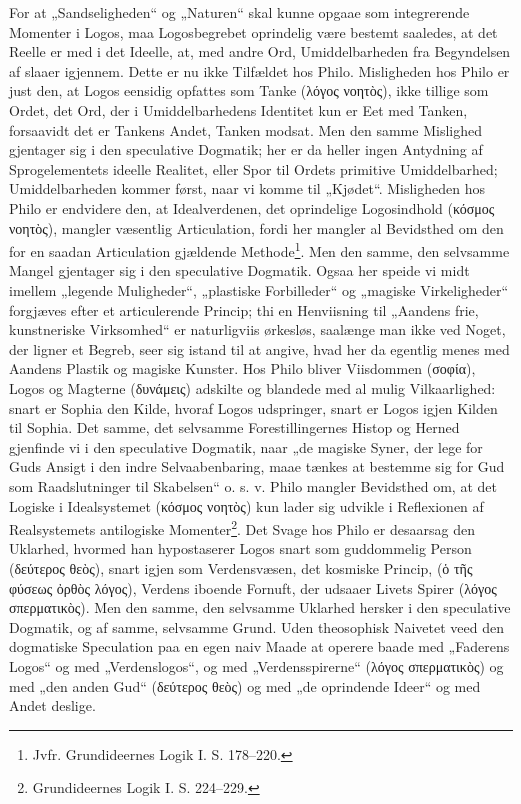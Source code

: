 \documentclass[12pt]{book}
\newcommand{\opage}[1]{\marginnote{\footnotesize\textit{[#1]}}}
\begin{document}
For at „Sandseligheden“ og „Naturen“ skal kunne opgaae
som integrerende Momenter i Logos, maa Logosbegrebet
oprindelig være bestemt saaledes, at det Reelle er med i det
Ideelle, at, med andre Ord, Umiddelbarheden fra Begyndelsen
af slaaer igjennem. Dette er nu ikke Tilfældet hos Philo.
Misligheden hos Philo er just den, at Logos eensidig opfattes
som Tanke (λόγος νοητὸς), ikke tillige som Ordet, det Ord,
der i Umiddelbarhedens Identitet kun er Eet med Tanken,
forsaavidt det er Tankens Andet, Tanken modsat. Men den
samme Mislighed gjentager sig i den speculative Dogmatik;
her er da heller ingen Antydning af Sprogelementets ideelle Realitet,
eller Spor til Ordets primitive Umiddelbarhed; Umiddelbarheden
kommer først, naar vi komme til „Kjødet“. Misligheden
hos Philo er endvidere den, at Idealverdenen, det oprindelige
Logosindhold (κόσμος νοητὸς), mangler væsentlig
Articulation, fordi her mangler al Bevidsthed om den for en
saadan Articulation gjældende Methode\footnote{Jvfr. Grundideernes Logik I. S. 178--220.}. %
Men den samme,
den selvsamme Mangel gjentager sig i den speculative Dogmatik.
Ogsaa her speide vi midt imellem „legende Muligheder“,
„plastiske Forbilleder“ og „magiske Virkeligheder“
\opage{92}forgjæves efter et articulerende Princip; thi en Henviisning
til „Aandens frie, kunstneriske Virksomhed“ er naturligviis
ørkesløs, saalænge man ikke ved Noget, der ligner et Begreb,
seer sig istand til at angive, hvad her da egentlig menes med
Aandens Plastik og magiske Kunster. Hos Philo bliver Viisdommen
(σοφία), Logos og Magterne (δυνάμεις) adskilte og
blandede med al mulig Vilkaarlighed: snart er Sophia den
Kilde, hvoraf Logos udspringer, snart er Logos igjen Kilden
til Sophia. Det samme, det selvsamme Forestillingernes Histop
og Herned gjenfinde vi i den speculative Dogmatik, naar „de
magiske Syner, der lege for Guds Ansigt i den indre Selvaabenbaring,
maae tænkes at bestemme sig for Gud som
Raadslutninger til Skabelsen“ o. s. v. Philo mangler Bevidsthed
om, at det Logiske i Idealsystemet (κόσμος νοητὸς)
kun lader sig udvikle i Reflexionen af Realsystemets antilogiske
Momenter\footnote{Grundideernes Logik I. S. 224--229.}. %
Det Svage hos Philo er desaarsag den Uklarhed,
hvormed han hypostaserer Logos snart som guddommelig
Person (δεύτερος θεὸς), snart igjen som Verdensvæsen, det
kosmiske Princip, (ὁ τῆς φύσεως ὀρθὸς λόγος), Verdens
iboende Fornuft, der udsaaer Livets Spirer (λόγος σπερματικὸς).
Men den samme, den selvsamme Uklarhed hersker i
den speculative Dogmatik, og af samme, selvsamme Grund.
Uden theosophisk Naivetet veed den dogmatiske Speculation paa %
en egen naiv Maade at operere baade med „Faderens Logos“
og med „Verdenslogos“, og med „Verdensspirerne“ (λόγος
σπερματικὸς) og med „den anden Gud“ (δεύτερος θεὸς)
og med „de oprindende Ideer“ og med Andet deslige.
\end{document}
